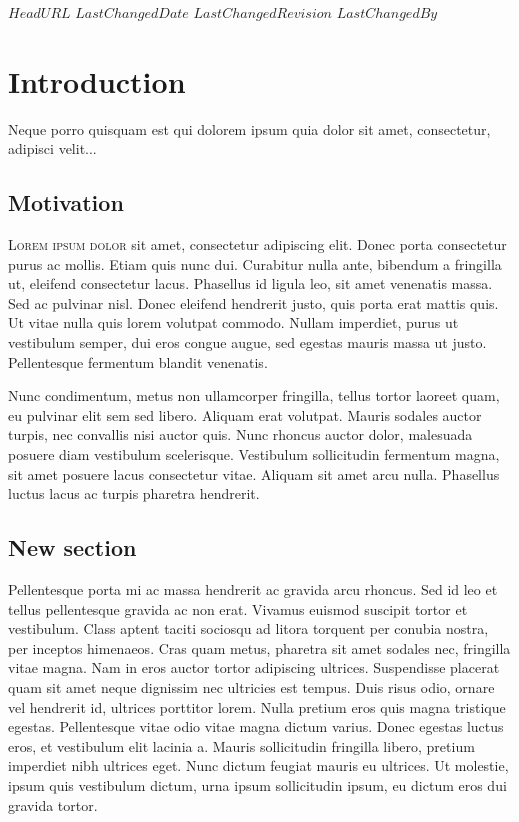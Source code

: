 \svnidlong
{$HeadURL$}
{$LastChangedDate$}
{$LastChangedRevision$}
{$LastChangedBy$}

\chapter{Introduction}

\begin{introduction}
  Neque porro quisquam est qui dolorem ipsum quia dolor sit amet, consectetur,
  adipisci velit...
\end{introduction}



\section{Motivation}

\lettrine[findent=-4pt, nindent=4.5pt]{L}{orem ipsum dolor} sit amet,
consectetur adipiscing elit. Donec
porta consectetur purus ac mollis. Etiam quis nunc dui. Curabitur nulla ante,
bibendum a fringilla ut, eleifend consectetur lacus. Phasellus id ligula leo,
sit amet venenatis massa. Sed ac pulvinar nisl. Donec eleifend hendrerit justo,
quis porta erat mattis quis. Ut vitae nulla quis lorem volutpat commodo. Nullam
imperdiet, purus ut vestibulum semper, dui eros congue augue, sed egestas mauris
massa ut justo. Pellentesque fermentum blandit venenatis.

Nunc condimentum, metus non ullamcorper fringilla, tellus tortor laoreet quam,
eu pulvinar elit sem sed libero. Aliquam erat volutpat. Mauris sodales auctor
turpis, nec convallis nisi auctor quis. Nunc rhoncus auctor dolor, malesuada
posuere diam vestibulum scelerisque. Vestibulum sollicitudin fermentum magna,
sit amet posuere lacus consectetur vitae. Aliquam sit amet arcu nulla. Phasellus
luctus lacus ac turpis pharetra hendrerit.



\section{New section}

Pellentesque porta mi ac massa hendrerit ac gravida arcu rhoncus. Sed id leo et
tellus pellentesque gravida ac non erat. Vivamus euismod suscipit tortor et
vestibulum. Class aptent taciti sociosqu ad litora torquent per conubia nostra,
per inceptos himenaeos. Cras quam metus, pharetra sit amet sodales nec,
fringilla vitae magna. Nam in eros auctor tortor adipiscing
ultrices. Suspendisse placerat quam sit amet neque dignissim nec ultricies est
tempus. Duis risus odio, ornare vel hendrerit id, ultrices porttitor
lorem. Nulla pretium eros quis magna tristique egestas. Pellentesque vitae odio
vitae magna dictum varius. Donec egestas luctus eros, et vestibulum elit lacinia
a. Mauris sollicitudin fringilla libero, pretium imperdiet nibh ultrices
eget. Nunc dictum feugiat mauris eu ultrices. Ut molestie, ipsum quis vestibulum
dictum, urna ipsum sollicitudin ipsum, eu dictum eros dui gravida tortor.

